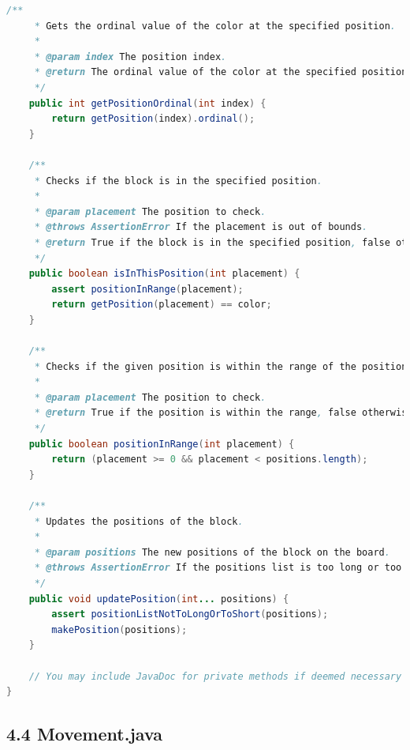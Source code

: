 \documentclass[a4paper,11pt]{article}
\begin{document}
\begin{lstlisting}[language=Java, breaklines=true]
    /**
     * Gets the ordinal value of the color at the specified position.
     *
     * @param index The position index.
     * @return The ordinal value of the color at the specified position.
     */
    public int getPositionOrdinal(int index) {
        return getPosition(index).ordinal();
    }

    /**
     * Checks if the block is in the specified position.
     *
     * @param placement The position to check.
     * @throws AssertionError If the placement is out of bounds.
     * @return True if the block is in the specified position, false otherwise.
     */
    public boolean isInThisPosition(int placement) {
        assert positionInRange(placement);
        return getPosition(placement) == color;
    }

    /**
     * Checks if the given position is within the range of the positions array.
     *
     * @param placement The position to check.
     * @return True if the position is within the range, false otherwise.
     */
    public boolean positionInRange(int placement) {
        return (placement >= 0 && placement < positions.length);
    }

    /**
     * Updates the positions of the block.
     *
     * @param positions The new positions of the block on the board.
     * @throws AssertionError If the positions list is too long or too short.
     */
    public void updatePosition(int... positions) {
        assert positionListNotToLongOrToShort(positions);
        makePosition(positions);
    }

    // You may include JavaDoc for private methods if deemed necessary for clarity or future maintenance.
}


\end{lstlisting}
\newpage

\subsection{4.4 Movement.java}
\end{document}
